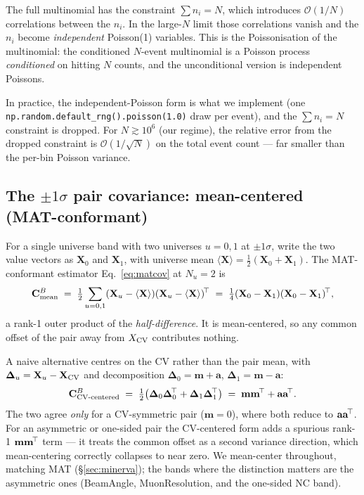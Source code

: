 The full multinomial has the constraint $\sum n_{i}=N$, which
introduces $\mathcal{O}(1/N)$ correlations between the $n_{i}$. In the
large-$N$ limit those correlations vanish and the $n_{i}$ become
\emph{independent} Poisson(1) variables. This is the Poissonisation
of the multinomial: the conditioned $N$-event multinomial is a
Poisson process \emph{conditioned} on hitting $N$ counts, and the
unconditional version is independent Poissons.

In practice, the independent-Poisson form is what we implement (one
\texttt{np.random.default\_rng().poisson(1.0)} draw per event), and
the $\sum n_{i}=N$ constraint is dropped. For $N \gtrsim 10^{6}$
(our regime), the relative error from the dropped constraint is
$\mathcal{O}(1/\sqrt{N})$ on the total event count --- far smaller
than the per-bin Poisson variance.

\subsection{The $\pm 1\sigma$ pair covariance: mean-centered (MAT-conformant)}
\label{app:pair}

For a single universe band with two universes $u=0,1$ at $\pm 1\sigma$,
write the two value vectors as $\mathbf{X}_{0}$ and $\mathbf{X}_{1}$,
with universe mean $\langle\mathbf{X}\rangle = \tfrac12(\mathbf{X}_{0}
+\mathbf{X}_{1})$. The MAT-conformant estimator
Eq.~\eqref{eq:matcov} at $N_{u}=2$ is
\begin{equation}
\mathbf{C}^{B}_{\text{mean}}
\;=\;
\tfrac12\sum_{u=0,1}(\mathbf{X}_{u}-\langle\mathbf{X}\rangle)(\mathbf{X}_{u}-\langle\mathbf{X}\rangle)^{\!\top}
\;=\;
\tfrac14(\mathbf{X}_{0}-\mathbf{X}_{1})(\mathbf{X}_{0}-\mathbf{X}_{1})^{\!\top},
\end{equation}
a rank-1 outer product of the \emph{half-difference}. It is mean-centered,
so any common offset of the pair away from $X_{\text{CV}}$ contributes
nothing.

A naive alternative centres on the CV rather than the pair mean, with
$\boldsymbol{\Delta}_{u} = \mathbf{X}_{u}-\mathbf{X}_{\text{CV}}$ and decomposition
$\boldsymbol{\Delta}_{0}=\mathbf{m}+\mathbf{a}$,
$\boldsymbol{\Delta}_{1}=\mathbf{m}-\mathbf{a}$:
\begin{equation}
\mathbf{C}^{B}_{\text{CV-centered}}
\;=\;
\tfrac{1}{2}\big(\boldsymbol{\Delta}_{0}\boldsymbol{\Delta}_{0}^{\!\top}
                + \boldsymbol{\Delta}_{1}\boldsymbol{\Delta}_{1}^{\!\top}\big)
\;=\;
\mathbf{m}\mathbf{m}^{\!\top} + \mathbf{a}\mathbf{a}^{\!\top}.
\end{equation}
The two agree \emph{only} for a CV-symmetric pair ($\mathbf{m}=0$),
where both reduce to $\mathbf{a}\mathbf{a}^{\!\top}$. For an asymmetric or
one-sided pair the CV-centered form adds a spurious rank-1
$\mathbf{m}\mathbf{m}^{\!\top}$ term --- it treats the common offset as a second
variance direction, which mean-centering correctly collapses to near
zero. We mean-center throughout, matching MAT (\S\ref{sec:minerva}); the
bands where the distinction matters are the asymmetric ones (BeamAngle,
MuonResolution, and the one-sided NC band).

